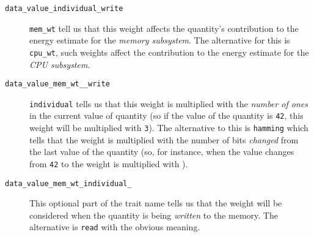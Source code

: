 \begin{description}
\item[\texttt{data\_value\_individual\_write}] \hfill

  \texttt{mem\_wt} tell us that this weight affects the quantity's
  contribution to the energy estimate for the \textit{memory
    subsystem}.  The alternative for this is \texttt{cpu\_wt}, such
  weights affect the contribution to the energy estimate for the
  \textit{CPU subsystem}.

\item[\texttt{data\_value\_mem\_wt\_\_write}] \hfill

  \texttt{individual} tells us that this weight is multiplied with the
  \textit{number of ones} in the current value of quantity (so if the
  value of the quantity is \texttt{42}, this weight will be multiplied
  with \texttt{3}).  The alternative to this is \texttt{hamming} which
  tells that the weight is multiplied with the number of bits
  \textit{changed} from the last value of the quantity (so, for
  instance, when the value changes from \texttt{42} to  the
  weight is multiplied with ).

\item[\texttt{data\_value\_mem\_wt\_individual\_}] \hfill

  This optional part of the trait name tells us that the weight will
  be considered when the quantity is being \textit{written} to the
  memory.  The alternative is \texttt{read} with the obvious meaning.
  
\end{description}

